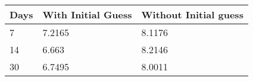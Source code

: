 \begin{tabular}{lll}
Days & With Initial Guess & Without Initial guess \\ 
\hline 
7 & 7.2165 & 8.1176 \\ 
14 & 6.663 & 8.2146 \\ 
30 & 6.7495 & 8.0011 \\ 
\hline 
\end{tabular}